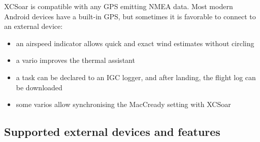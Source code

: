XCSoar is compatible with any GPS emitting NMEA data.  Most modern
Android devices have a built-in GPS, but sometimes it is favorable to
connect to an external device:

\begin{itemize}
\item an airspeed indicator allows quick and exact wind estimates
  without circling
\item a vario improves the thermal assistant
\item a task can be declared to an IGC logger, and after landing, the
  flight log can be downloaded
\item some varios allow synchronising the MacCready setting with
  XCSoar
\end{itemize}

\subsection*{Supported external devices and features}
\label{sec:supported-varios}

